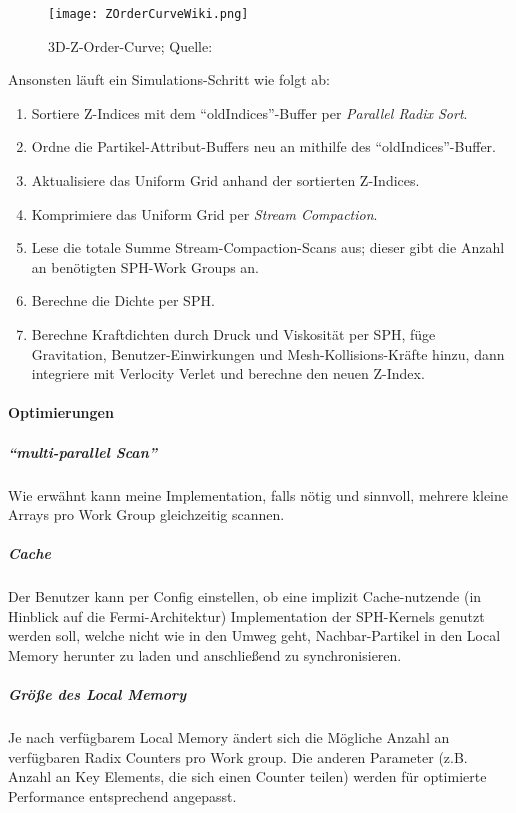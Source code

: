 		\begin{figure}[h]
		\centering
		\texttt{[image: ZOrderCurveWiki.png]}
		\caption{3D-Z-Order-Curve; Quelle: \cite{wiki:ZCurve} }
		\label{fig:zOrderCurve}
		\end{figure}
		
		Ansonsten läuft ein Simulations-Schritt wie folgt ab:
		\begin{enumerate}
			\item Sortiere Z-Indices mit dem "`oldIndices"'-Buffer per \emph{Parallel Radix Sort}.
			\item Ordne die Partikel-Attribut-Buffers neu an mithilfe des "`oldIndices"'-Buffer.
			\item Aktualisiere das Uniform Grid anhand der sortierten Z-Indices.
			\item Komprimiere das Uniform Grid per \emph{Stream Compaction}.
			\item Lese die totale Summe Stream-Compaction-Scans aus; 
				dieser gibt die Anzahl an benötigten SPH-Work Groups an.
			\item Berechne die Dichte per SPH.
			\item Berechne Kraftdichten durch Druck und Viskosität per SPH, füge Gravitation, Benutzer-Einwirkungen und 
			Mesh-Kollisions-Kräfte hinzu, dann integriere mit Verlocity Verlet und berechne den neuen Z-Index.
		\end{enumerate}
		

	\paragraph{Optimierungen}
	\label{sec:hardwareOptimizations}
		
		\subparagraph{"`multi-parallel Scan"'}
			Wie erwähnt kann meine Implementation, falls nötig und sinnvoll, mehrere kleine Arrays pro 
			Work Group gleichzeitig scannen.
	
		\subparagraph{Cache}
			Der Benutzer kann per Config einstellen, ob eine implizit Cache-nutzende (in Hinblick auf die
			Fermi-Architektur) Implementation der SPH-Kernels genutzt werden soll, welche nicht 
			wie in \cite{Goswami2010} den Umweg geht,
			Nachbar-Partikel in den Local Memory herunter zu laden und anschließend zu synchronisieren.
		
		\subparagraph{Größe des Local Memory}
			Je nach verfügbarem Local Memory ändert sich die Mögliche Anzahl an verfügbaren
			Radix Counters pro Work group. Die anderen Parameter (z.B. Anzahl an Key Elements, die sich einen
			Counter teilen) werden für optimierte Performance entsprechend angepasst.
			
